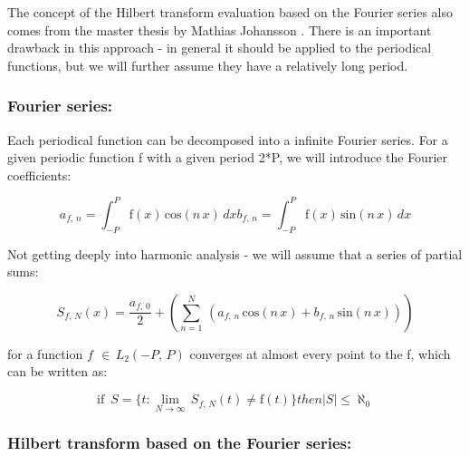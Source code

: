 \documentclass[12pt,twoside,a4paper]{article}
\numberwithin{equation}{subsection}
\numberwithin{figure}{subsection}
\begin{document}
The concept of the Hilbert transform evaluation based on the Fourier series also comes from the master thesis by Mathias Johansson
\cite{johansson_hilbert}. There is an important drawback in this approach - in general it should be applied to the periodical
functions, but we will further assume they have a relatively long period. 

\subsubsection*{Fourier series:} 

Each periodical function can be decomposed into a infinite Fourier series. For a given periodic function f with a given period 2*P,
we will introduce the Fourier coefficients:

\begin{subequations} \label{eq:fourier_coeffs}
  \begin{equation}   \label{eq:fcoeffs_an}
    {a_{f, \,n}}=\int_{ - P}^{P}\mathrm{f}(x)\,\mathrm{cos}(n\,x)\, dx
  \end{equation}
  \begin{equation}   \label{eq:fcoeffs_bn}
    {b_{f, \,n}}=\int_{ - P}^{P}\mathrm{f}(x)\,\mathrm{sin}(n\,x)\, dx
  \end{equation}
\end{subequations}

Not getting deeply into harmonic analysis - we will assume that a series of partial sums:

\begin{equation} \label{eq:fourier_partialsums}
  {S_{f, \,N}}(x)=\frac {{a_{f, \,0}}}{2} + (\sum_{n=1}^{N}\,({a
_{f, \,n}}\,\mathrm{cos}(n\,x) + {b_{f, \,n}}\,\mathrm{sin}(n\,x)
))
\end{equation}

for a function $f\,\ \in \,{L_{2}}( - P, \,P)$ converges at almost every point to the f, which can be written as:

\begin{equation} \label{eq:fourier_canbewritten}
  \mbox{if }\,S = \{t : \lim_{N\rightarrow \infty }\,{S_{f, \,N}}(t) \neq \mathrm{f}(t) \} then |S| \leq {\aleph_{0}}
\end{equation}

\subsubsection*{Hilbert transform based on the Fourier series:}
\end{document}
